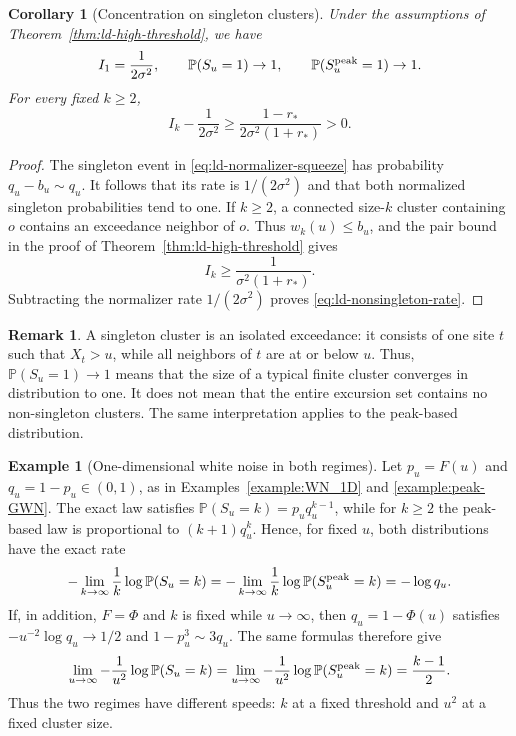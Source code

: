 \documentclass[aap,preprint]{imsart}
\theoremstyle{plain}
\newtheorem{corollary}[theorem]{Corollary}
\theoremstyle{definition}
\newtheorem{example}[theorem]{Example}
\newtheorem{remark}[theorem]{Remark}
\def\P{{\mathbb P}}
\begin{document}
\begin{corollary}[Concentration on singleton clusters]
	\label{cor:ld-singleton}
	Under the assumptions of Theorem~\ref{thm:ld-high-threshold}, we have
	\begin{equation}\label{eq:ld-singleton-rate}
		I_1=\frac1{2\sigma^2},
		\qquad
		\P(S_u=1)\to 1,
		\qquad
		\P(S_u^{\rm peak}=1)\to 1.
	\end{equation}
	For every fixed $k\geq2$,
	\begin{equation}\label{eq:ld-nonsingleton-rate}
		I_k-\frac1{2\sigma^2}
		\geq
		\frac{1-r_*}{2\sigma^2(1+r_*)}>0.
	\end{equation}
\end{corollary}

\begin{proof}
	The singleton event in \eqref{eq:ld-normalizer-squeeze} has probability
	$q_u-b_u\sim q_u$.  It follows that its rate is $1/(2\sigma^2)$ and that
	both normalized singleton probabilities tend to one.  If $k\geq2$, a
	connected size-$k$ cluster containing $o$ contains an exceedance neighbor
	of $o$.  Thus $w_k(u)\leq b_u$, and the pair bound in the proof of
	Theorem~\ref{thm:ld-high-threshold} gives
	\[
	I_k\geq\frac1{\sigma^2(1+r_*)}.
	\]
	Subtracting the normalizer rate $1/(2\sigma^2)$ proves
	\eqref{eq:ld-nonsingleton-rate}.
\end{proof}

\begin{remark}
	A singleton cluster is an isolated exceedance: it consists of one
	site \(t\) such that \(X_t>u\), while all neighbors of \(t\) are at
	or below \(u\). Thus, \(\P(S_u=1)\to1\) means that the size of a
	typical finite cluster converges in distribution to one. It does not
	mean that the entire excursion set contains no non-singleton
	clusters. The same interpretation applies to the peak-based
	distribution.
\end{remark}

\begin{example}[One-dimensional white noise in both regimes]
	\label{example:ld-white-noise}
	Let $p_u=F(u)$ and $q_u=1-p_u\in(0,1)$, as in
	Examples~\ref{example:WN_1D} and \ref{example:peak-GWN}.  The exact law
	satisfies $\P(S_u=k)=p_uq_u^{k-1}$, while for $k\geq2$ the peak-based law is
	proportional to $(k+1)q_u^k$.  Hence, for fixed $u$, both distributions have
	the exact rate
	\[
	-\lim_{k\to\infty}\frac1k\log\P(S_u=k)
	=
	-\lim_{k\to\infty}\frac1k\log\P(S_u^{\rm peak}=k)
	=-\log q_u.
	\]
	If, in addition, $F=\Phi$ and $k$ is fixed while $u\to\infty$, then
	$q_u=1-\Phi(u)$ satisfies $-u^{-2}\log q_u\to1/2$ and
	$1-p_u^3\sim3q_u$.  The same formulas therefore give
	\begin{equation}\label{eq:ld-white-noise-high-u}
		\lim_{u\to\infty}-\frac1{u^2}\log\P(S_u=k)
		=
		\lim_{u\to\infty}-\frac1{u^2}
		\log\P(S_u^{\rm peak}=k)
		=\frac{k-1}{2}.
	\end{equation}
	Thus the two regimes have different speeds: $k$ at a fixed threshold and
	$u^2$ at a fixed cluster size.
\end{example}
\end{document}
